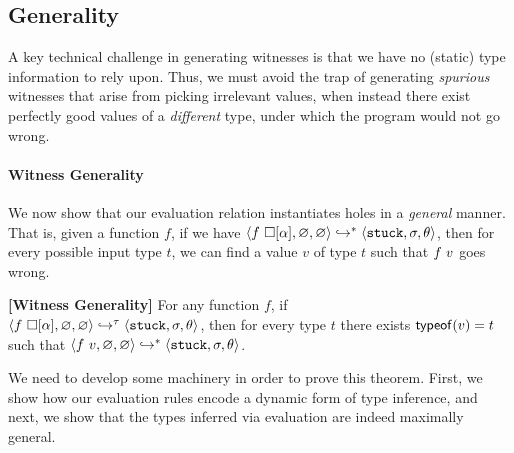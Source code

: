 
%
\subsection{Generality}\label{sec:soundness}

A key technical challenge in generating witnesses is
that we have no (static) type information to rely upon. Thus, we
must avoid the trap of generating \emph{spurious} witnesses that
arise from picking irrelevant values, when instead there exist
perfectly good values of a \emph{different} type, under which
the program would not go wrong.

\paragraph{Witness Generality}
We now show that our evaluation relation instantiates holes in a
\emph{general} manner. That is, given a function $f$, if we have
$\langle f\ \square[\alpha], \varnothing, \varnothing \rangle \hookrightarrow^{*} \langle \mathtt{stuck}, \sigma, \theta \rangle$,
then for every possible input type $t$, we can find a value
$v$ of type $t$ such that $f\ v$ goes wrong.

\begin{thm}{\textbf{[Witness Generality]}}
\label{thm:soundness}
  For any function $f$, if\\
  \hbox{$\langle f\ \square[\alpha], \varnothing, \varnothing \rangle \hookrightarrow^{\tau} \langle \mathtt{stuck}, \sigma, \theta \rangle$,}
  then for every %
  type
  $t$ there exists $\mathsf{typeof}(v) = {t}$ such that
  $\langle f\ v, \varnothing, \varnothing \rangle \hookrightarrow^{*} \langle \mathtt{stuck}, \sigma, \theta \rangle$.
\end{thm}

We need to develop some machinery in order to prove this theorem.
First, we show how our evaluation rules encode a dynamic form of
type inference, and next, we show that the types inferred via
evaluation are indeed maximally general.

